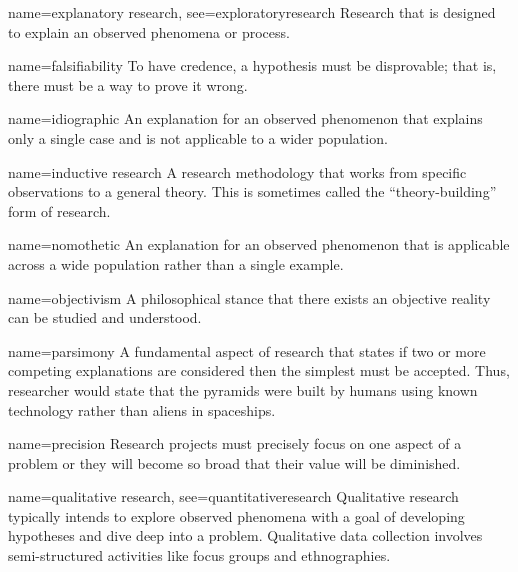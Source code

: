 {name={explanatory research},
	see={exploratoryresearch}}
{%
	Research that is designed to explain an observed phenomena or process. 
}


{name={falsifiability}}
{%
	To have credence, a hypothesis must be disprovable; that is, there must be a way to prove it wrong.
}

{name={idiographic}}
{%
	An explanation for an observed phenomenon that explains only a single case and is not applicable to a wider population.
}

{name={inductive research}}
{%
	A research methodology that works from specific observations to a general theory. This is sometimes called the ``theory-building'' form of research.
}

{name={nomothetic}}
{%
	An explanation for an observed phenomenon that is applicable across a wide population rather than a single example.
}

{name={objectivism}}
{%
	A philosophical stance that there exists an objective reality can be studied and understood.
}



	{name={parsimony}}
	{%
		A fundamental aspect of research that states if two or more competing explanations are considered then the simplest must be accepted. Thus, researcher would state that the pyramids were built by humans using known technology rather than aliens in spaceships.
	}

	{name={precision}}
	{%
		Research projects must precisely focus on one aspect of a problem or they will become so broad that their value will be diminished.
	}

{name={qualitative research},
	see={quantitativeresearch}}
{%
	Qualitative research typically intends to explore observed phenomena with a 
	goal of developing hypotheses and dive deep into a problem. Qualitative 
	data collection involves semi-structured activities like focus groups
	and ethnographies.
}


